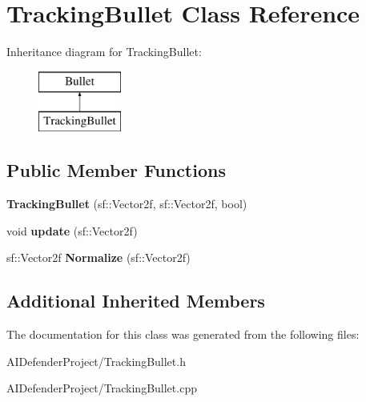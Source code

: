 \hypertarget{class_tracking_bullet}{}\section{Tracking\+Bullet Class Reference}
\label{class_tracking_bullet}
Inheritance diagram for Tracking\+Bullet\+:\begin{figure}[H]
\begin{center}
\leavevmode
\includegraphics[height=2.000000cm]{class_tracking_bullet}
\end{center}
\end{figure}
\subsection*{Public Member Functions}
\begin{DoxyCompactItemize}
\item 
\mbox{\label{class_tracking_bullet_abcfcaaa22d6f571037038f978d1ca79a}} 
{\bfseries Tracking\+Bullet} (sf\+::\+Vector2f, sf\+::\+Vector2f, bool)
\item 
\mbox{\label{class_tracking_bullet_a0ef27cc3f807201c3b19ddc86460f09c}} 
void {\bfseries update} (sf\+::\+Vector2f)
\item 
\mbox{\label{class_tracking_bullet_a6567a9eba421686f91e2f1766de31954}} 
sf\+::\+Vector2f {\bfseries Normalize} (sf\+::\+Vector2f)
\end{DoxyCompactItemize}
\subsection*{Additional Inherited Members}


The documentation for this class was generated from the following files\+:\begin{DoxyCompactItemize}
\item 
A\+I\+Defender\+Project/Tracking\+Bullet.\+h\item 
A\+I\+Defender\+Project/Tracking\+Bullet.\+cpp\end{DoxyCompactItemize}
